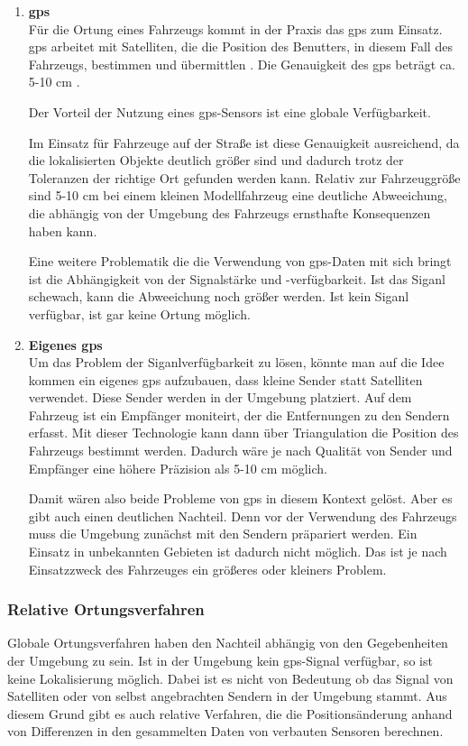 \begin{enumerate}[leftmargin=*]
    \item \textbf{\acf{gps}} \\
    Für die Ortung eines Fahrzeugs kommt in der Praxis das \ac{gps} zum Einsatz. 
    \ac{gps} arbeitet mit Satelliten, die die Position des Benutters, in diesem Fall des Fahrzeugs, bestimmen
    und übermittlen \cite{ashby2003relativity}. Die Genauigkeit des \ac{gps} beträgt ca. 5-10 cm \cite{ashby2003relativity}.

    Der Vorteil der Nutzung eines \ac{gps}-Sensors ist eine globale Verfügbarkeit.

    Im Einsatz für Fahrzeuge auf der Straße ist diese Genauigkeit ausreichend, da die lokalisierten Objekte deutlich größer sind und dadurch
    trotz der Toleranzen der richtige Ort gefunden werden kann.
    Relativ zur Fahrzeuggröße sind 5-10 cm bei einem kleinen Modellfahrzeug eine deutliche Abweeichung, die abhängig von der Umgebung des Fahrzeugs ernsthafte Konsequenzen haben kann.

    Eine weitere Problematik die die Verwendung von \ac{gps}-Daten mit sich bringt ist die Abhängigkeit von der Signalstärke und -verfügbarkeit. 
    Ist das Siganl schewach, kann die Abweeichung noch größer werden. Ist kein Siganl
    verfügbar, ist gar keine Ortung möglich.
    
    \item \textbf{Eigenes \ac{gps}} \\
    Um das Problem der Siganlverfügbarkeit zu lösen, könnte man auf die Idee kommen ein eigenes \acf{gps} aufzubauen, dass kleine Sender statt Satelliten verwendet.
    Diese Sender werden in der Umgebung platziert. 
    Auf dem Fahrzeug ist ein Empfänger moniteirt, der die Entfernungen zu den Sendern erfasst.
    Mit dieser Technologie kann dann über Triangulation die Position des Fahrzeugs bestimmt werden. Dadurch wäre je nach Qualität von Sender und Empfänger eine höhere Präzision als 
    5-10 cm möglich. 
    
    Damit wären also beide Probleme von \ac{gps} in diesem Kontext gelöst. Aber es gibt auch einen deutlichen Nachteil. Denn vor der Verwendung des Fahrzeugs muss die Umgebung zunächst
    mit den Sendern präpariert werden. Ein Einsatz in unbekannten Gebieten ist dadurch nicht möglich. Das ist je nach Einsatzzweck des Fahrzeuges ein größeres oder kleiners Problem.
\end{enumerate}

\subsubsection{Relative Ortungsverfahren}
Globale Ortungsverfahren haben den Nachteil abhängig von den Gegebenheiten der Umgebung zu sein.
Ist in der Umgebung kein \ac{gps}-Signal verfügbar, so ist keine Lokalisierung möglich.
Dabei ist es nicht von Bedeutung ob das Signal von Satelliten oder von selbst angebrachten Sendern in der Umgebung stammt.
Aus diesem Grund gibt es auch relative Verfahren, die die Positionsänderung anhand von Differenzen in den gesammelten Daten 
von verbauten Sensoren berechnen.


